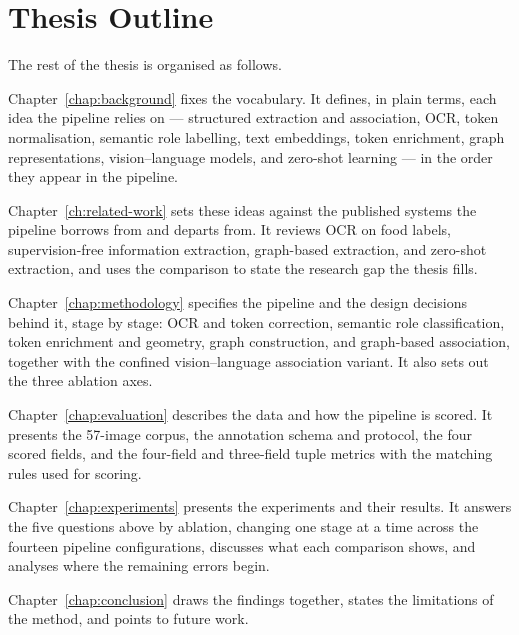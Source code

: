 \section{Thesis Outline}\label{sec:intro-outline}

The rest of the thesis is organised as follows.

Chapter~\ref{chap:background} fixes the vocabulary. It defines, in plain terms,
each idea the pipeline relies on --- structured extraction and association, OCR,
token normalisation, semantic role labelling, text embeddings, token enrichment,
graph representations, vision--language models, and zero-shot learning --- in the
order they appear in the pipeline.

Chapter~\ref{ch:related-work} sets these ideas against the published systems the
pipeline borrows from and departs from. It reviews OCR on food labels,
supervision-free information extraction, graph-based extraction, and zero-shot
extraction, and uses the comparison to state the research gap the thesis fills.

Chapter~\ref{chap:methodology} specifies the pipeline and the design decisions
behind it, stage by stage: OCR and token correction, semantic role
classification, token enrichment and geometry, graph construction, and
graph-based association, together with the confined vision--language association
variant. It also sets out the three ablation axes.

Chapter~\ref{chap:evaluation} describes the data and how the pipeline is scored.
It presents the 57-image corpus, the annotation schema and protocol, the four
scored fields, and the four-field and three-field tuple metrics with the matching
rules used for scoring.

Chapter~\ref{chap:experiments} presents the experiments and their results. It
answers the five questions above by ablation, changing one stage at a time across
the fourteen pipeline configurations, discusses what each comparison shows, and
analyses where the remaining errors begin.

Chapter~\ref{chap:conclusion} draws the findings together, states the limitations
of the method, and points to future work.